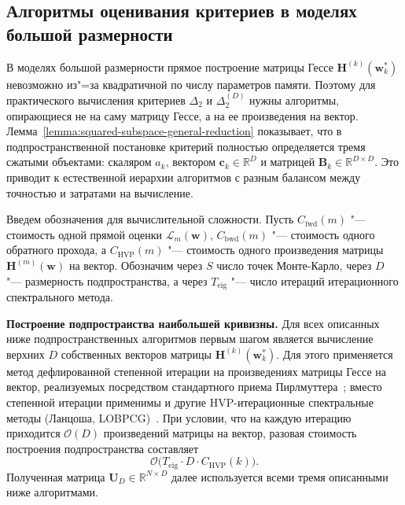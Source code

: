 \subsection{Алгоритмы оценивания критериев в моделях большой размерности}\label{subsec:algorithms}

В моделях большой размерности прямое построение матрицы Гессе $\mathbf H^{(k)}(\mathbf w_k^*)$ невозможно из"=за квадратичной по числу параметров памяти. Поэтому для практического вычисления критериев $\Delta_2$ и $\Delta_2^{(D)}$ нужны алгоритмы, опирающиеся не на саму матрицу Гессе, а на ее произведения на вектор. Лемма~\ref{lemma:squared-subspace-general-reduction} показывает, что в подпространственной постановке критерий полностью определяется тремя сжатыми объектами: скаляром $a_k$, вектором $\mathbf c_k \in \mathbb R^D$ и матрицей $\mathbf B_k \in \mathbb R^{D\times D}$. Это приводит к естественной иерархии алгоритмов с разным балансом между точностью и затратами на вычисление.

Введем обозначения для вычислительной сложности. Пусть $C_{\mathrm{fwd}}(m)$ "--- стоимость одной прямой оценки $\mathcal L_m(\mathbf w)$, $C_{\mathrm{bwd}}(m)$ "--- стоимость одного обратного прохода, а $C_{\mathrm{HVP}}(m)$ "--- стоимость одного произведения матрицы $\mathbf H^{(m)}(\mathbf w)$ на вектор. Обозначим через $S$ число точек Монте-Карло, через $D$ "--- размерность подпространства, а через $T_{\mathrm{eig}}$ "--- число итераций итерационного спектрального метода.

\textbf{Построение подпространства наибольшей кривизны.} Для всех описанных ниже подпространственных алгоритмов первым шагом является вычисление верхних $D$ собственных векторов матрицы $\mathbf H^{(k)}(\mathbf w_k^*)$. Для этого применяется метод дефлированной степенной итерации на произведениях матрицы Гессе на вектор, реализуемых посредством стандартного приема Пирлмуттера~\cite{pearlmutter1994fast}; вместо степенной итерации применимы и другие HVP-итерационные спектральные методы (Ланцоша, LOBPCG)~\cite{yao2020pyhessian}. При условии, что на каждую итерацию приходится $\mathcal O(D)$ произведений матрицы на вектор, разовая стоимость построения подпространства составляет
\begin{equation}
    \mathcal O\bigl(T_{\mathrm{eig}} \cdot D \cdot C_{\mathrm{HVP}}(k)\bigr).
\end{equation}
Полученная матрица $\mathbf U_D \in \mathbb R^{N\times D}$ далее используется всеми тремя описанными ниже алгоритмами.

